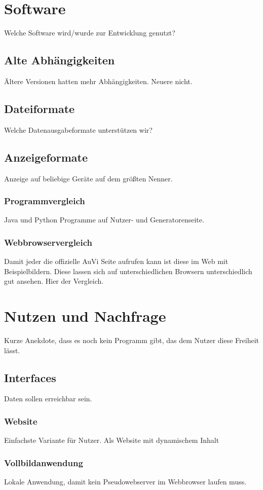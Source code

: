 \documentclass[a4paper,oneside,10pt,titlepage]{article}
\begin{document}
\section{Software}
Welche Software wird/wurde zur Entwicklung genutzt?
\subsection{Alte Abhängigkeiten}
Ältere Versionen hatten mehr Abhängigkeiten. Neuere nicht.
\subsection{Dateiformate}
Welche Datenausgabeformate unterstützen wir?
\subsection{Anzeigeformate}
Anzeige auf beliebige Geräte auf dem größten Nenner.
\subsubsection{Programmvergleich}
Java und Python Programme auf Nutzer- und Generatorenseite.
\subsubsection{Webbrowservergleich}
Damit jeder die offizielle AuVi Seite aufrufen kann ist diese im Web mit Beispielbildern. Diese lassen sich auf unterschiedlichen Browsern unterschiedlich gut ansehen. Hier der Vergleich.
\section{Nutzen und Nachfrage}
Kurze Anekdote, dass es noch kein Programm gibt, das dem Nutzer diese Freiheit lässt.
\subsection{Interfaces}
Daten sollen erreichbar sein.
\subsubsection{Website}
Einfachste Variante für Nutzer. Als Website mit dynamischem Inhalt
\subsubsection{Vollbildanwendung}
Lokale Anwendung, damit kein Pseudowebserver im Webbrowser laufen muss.
\end{document}
